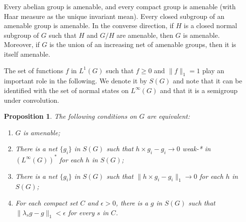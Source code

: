 \documentclass{book}
\newtheorem{proposition}[definition]{Proposition}
\begin{document}
Every abelian group is amenable, and every compact group is amenable (with
Haar measure as the unique invariant mean). Every closed subgroup of an
amenable group is amenable. In the converse direction, if \(H\) is a closed 
normal subgroup of \(G\) such that \(H\) and \(G/H\) are amenable, then \(G\) is amenable.
Moreover, if \(G\) is the union of an increasing net of amenable groups, then it is
itself amenable.\par
The set of functions \(f\) in \(L^1(G)\) such that \(f \geq 0\) and \(\|f\|_1 =1\) play an important
role in the following. We denote it by \(S(G)\) and note that it can be identified with
the set of normal states on \(L^\infty(G)\) and that it is a semigroup under convolution.
\begin{proposition}\label{Petersen:737}
  The following conditions on \(G\) are equivalent:
  \begin{enumerate}
    \item \(G\) is amenable;
    \item There is a net \(\{g_i\}\) in \(S(G)\) such that \(h\times g_i-g_i\rightarrow0\) weak-* in
      \((L^\infty(G))^*\) for each \(h\) in \(S(G)\);
    \item There is a net \(\{g_i\}\) in \(S(G)\) such that \(\|h\times g_i-g_i\|_1\rightarrow 0\) for each \(h\) in \(S(G)\);
    \item For each compact set \(C\) and \(\epsilon>0\), there is a \(g\) in \(S(G)\) such that \(\|\lambda_s g-g\|_1<\epsilon\) for every \(s\) in \(C\).
  \end{enumerate}  
\end{proposition}
\end{document}
